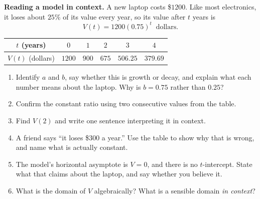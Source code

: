 \documentclass[10pt]{article}
\begin{document}
\begin{extensionbox}
\textbf{Reading a model in context.} A new laptop costs \$$1200$. Like most electronics, it loses
about $25\%$ of its value every year, so its value after $t$ years is
\[
  V(t) = 1200(0.75)^{t} \ \text{ dollars.}
\]
\begin{center}
\renewcommand{\arraystretch}{1.25}
\begin{tabular}{|c|c|c|c|c|c|}
\hline
$t$ (years) & $0$ & $1$ & $2$ & $3$ & $4$ \\ \hline
$V(t)$ (dollars) & $1200$ & $900$ & $675$ & $506.25$ & $379.69$ \\ \hline
\end{tabular}
\end{center}
\begin{enumerate}[label=(\alph*), leftmargin=1.8em, itemsep=5pt]
  \item Identify $a$ and $b$, say whether this is growth or decay, and explain what each number means
        about the laptop. Why is $b=0.75$ rather than $0.25$?
  \item Confirm the constant ratio using two consecutive values from the table.
  \item Find $V(2)$ and write one sentence interpreting it in context.
  \item A friend says ``it loses \$$300$ a year.'' Use the table to show why that is wrong, and name
        what is actually constant.
  \item The model's horizontal asymptote is $V=0$, and there is no $t$-intercept. State what that
        claims about the laptop, and say whether you believe it.
  \item What is the domain of $V$ algebraically? What is a sensible domain \emph{in context}?
\end{enumerate}
\end{extensionbox}
\end{document}
